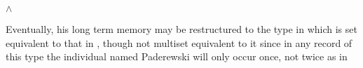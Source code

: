 \begin{ex} 
\begin{subex} 
 
\item {}\d{$\wedge$} 
 
\item {} 
 
\end{subex} 
\label{eg:Paderewski-linked}   
\end{ex} 
Eventually, his long term memory may be restructured to the type in
\nexteg{} which is set equivalent to that in \preveg{}, though not
multiset equivalent to it since in any record of this type the
individual named Paderewski will only occur once, not twice as in
